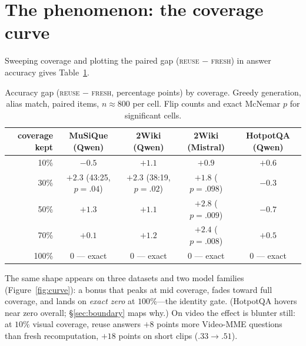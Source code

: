 \documentclass[11pt]{article}
\newcommand{\fresh}{\textsc{fresh}}
\newcommand{\reuse}{\textsc{reuse}}
\begin{document}
\section{The phenomenon: the coverage curve}
\label{sec:curve}

Sweeping coverage and plotting the paired gap (\reuse{} $-$ \fresh{}) in answer accuracy gives Table~\ref{tab:curve}.

\begin{table}[t]
\centering
\caption{Accuracy gap (\reuse{} $-$ \fresh{}, percentage points) by coverage. Greedy generation, alias match, paired items, $n\approx800$ per cell. Flip counts and exact McNemar $p$ for significant cells.}
\label{tab:curve}
\begin{tabular}{rcccc}
\toprule
coverage kept & MuSiQue (Qwen) & 2Wiki (Qwen) & 2Wiki (Mistral) & HotpotQA (Qwen) \\
\midrule
10\% & $-0.5$ & $+1.1$ & $+0.9$ & $+0.6$ \\
30\% & $\mathbf{+2.3}$ {\scriptsize(43:25, $p{=}.04$)} & $\mathbf{+2.3}$ {\scriptsize(38:19, $p{=}.02$)} & $+1.8$ {\scriptsize($p{=}.098$)} & $-0.3$ \\
50\% & $+1.3$ & $+1.1$ & $\mathbf{+2.8}$ {\scriptsize($p{=}.009$)} & $-0.7$ \\
70\% & $+0.1$ & $+1.2$ & $\mathbf{+2.4}$ {\scriptsize($p{=}.008$)} & $+0.5$ \\
100\% & 0 --- exact & 0 --- exact & 0 --- exact & 0 --- exact \\
\bottomrule
\end{tabular}
\end{table}

The same shape appears on three datasets and two model families (Figure~\ref{fig:curve}): a bonus that peaks at mid coverage, fades toward full coverage, and lands on \emph{exact zero} at $100\%$---the identity gate. (HotpotQA hovers near zero overall; \S\ref{sec:boundary} maps why.) On video the effect is blunter still: at $10\%$ visual coverage, reuse answers $+8$ points more Video-MME questions than fresh recomputation, $+18$ points on short clips ($.33\rightarrow.51$).
\end{document}
